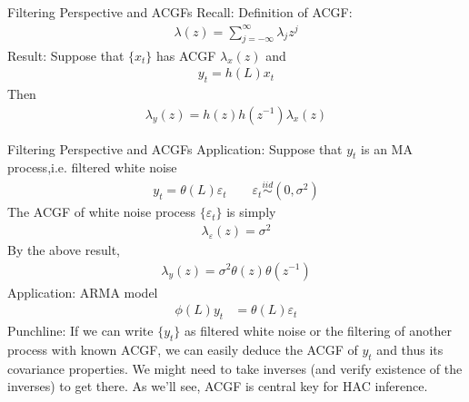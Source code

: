 \documentclass[handout]{beamer}
\newcommand{\iid}{\overset{iid}{\sim}}
\begin{document}
\begin{frame}[shrink]{Filtering Perspective and ACGFs}
\alert{Recall}: Definition of ACGF:
\begin{align*}
  \lambda(z)
  =
  \sum_{j=-\infty}^\infty \lambda_j z^j
\end{align*}
\alert{Result}:
Suppose that $\{x_t\}$ has ACGF $\lambda_x(z)$ and
\begin{align*}
  y_t = h(L)x_t
\end{align*}
Then
\begin{align*}
  \lambda_y(z) = h(z)h(z^{-1})\lambda_x(z)
\end{align*}
\end{frame}

\begin{frame}[shrink]{Filtering Perspective and ACGFs}
\alert{Application}:
Suppose that $y_t$ is an MA process,i.e. filtered white noise
\begin{align*}
  y_t = \theta(L)\varepsilon_t
  \qquad
  \varepsilon_t
  \iid
  (0,\sigma^2)
\end{align*}
The ACGF of white noise process $\{\varepsilon_t\}$ is simply
\begin{align*}
  \lambda_\varepsilon(z) = \sigma^2
\end{align*}
By the above result,
\begin{align*}
  \lambda_y(z) = \sigma^2 \theta(z)\theta(z^{-1})
\end{align*}
\pause
\alert{Application}:
ARMA model
\begin{align*}
  \phi(L)y_t
  &=
  \theta(L)\varepsilon_t
\end{align*}
\pause
\alert{Punchline}:
If we can write $\{y_t\}$ as filtered white noise or the filtering of
another process with known ACGF, we can easily deduce the ACGF of $y_t$
and thus its covariance properties.
We might need to take inverses (and verify existence of the inverses) to
get there.
As we'll see, ACGF is central key for HAC inference.
\end{frame}




\end{document}
